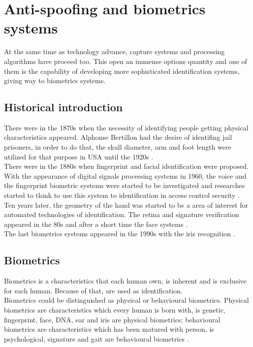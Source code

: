 \section{Anti-spoofing and biometrics systems}
At the same time as technology advance, capture systems and processing algorithms have proceed too. This open an immense options quantity and one of them is the capability of developing more sophisticated identification systems, giving way to biometrics systems.\\

\subsection{Historical introduction}
There were in the 1870s when the necessity of identifying people getting physical characteristics appeared. Alphonse Bertillon had the desire of identifing jail prisoners, in order to do that, the skull diameter, arm and foot length were utilized for that purpose in USA until the 1920s \cite{Intro_biometrics}.\\

There were in the 1880s when fingerprint and facial identification were proposed. With the appearance of digital signals processing systems in 1960, the voice and the fingerprint biometric systems were started to be investigated and researches started to think to use this system to identification in access control security \cite{Intro_biometrics}.\\
 
Ten years later, the geometry of the hand was started to be a area of interest for automated technologies of identification. The retina and signature verification appeared in the 80s and after a short time the face systems \cite{Intro_biometrics}.\\

The last biometrics systems appeared in the 1990s with the iris recognition \cite{Intro_biometrics}.\\

\subsection{Biometrics}
Biometrics is a characteristics that each human own, is inherent and is exclusive for each human. Because of that, are used as identification.\\

Biometrics could be distinguished as physical or behavioural biometrics. Physical biometrics are characteristics which every human is born with, is genetic, fingerprint, face, DNA, ear and iris are physical biometrics; behavioural biometrics are characteristics which has been matured with person, is  psychological, signature and gait are behavioural biometrics \cite{biometrics_beha}.\\

